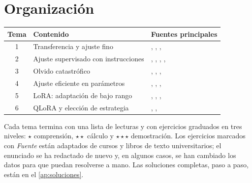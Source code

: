 \documentclass[11pt,a4paper,twoside,openany]{book}
\begin{document}
\section*{Organización}
\begin{center}\small
\begin{tabular}{@{}cll@{}}
\toprule
Tema & Contenido & Fuentes principales \\
\midrule
1 & Transferencia y ajuste fino & \cite{jm3}, \cite{howard-ruder}, \cite{d2l}, \cite{cs224n} \\
2 & Ajuste supervisado con instrucciones & \cite{jm3}, \cite{cs336}, \cite{wei-flan}, \cite{ouyang}, \cite{zhou-lima} \\
3 & Olvido catastrófico & \cite{mccloskey}, \cite{kirkpatrick}, \cite{bishop}, \cite{gbc} \\
4 & Ajuste eficiente en parámetros & \cite{houlsby}, \cite{lester}, \cite{li-liang}, \cite{aghajanyan} \\
5 & LoRA: adaptación de bajo rango & \cite{hu-lora}, \cite{eckart-young}, \cite{mml}, \cite{cs224n} \\
6 & QLoRA y elección de estrategia & \cite{dettmers}, \cite{cs336a1}, \cite{jm3} \\
\bottomrule
\end{tabular}
\end{center}

Cada tema termina con una lista de lecturas y con ejercicios graduados en tres niveles: $\star$ comprensión, $\star\star$ cálculo y $\star\star\star$ demostración. Los ejercicios marcados con \emph{Fuente} están adaptados de cursos y libros de texto universitarios; el enunciado se ha redactado de nuevo y, en algunos casos, se han cambiado los datos para que puedan resolverse a mano. Las soluciones completas, paso a paso, están en el \cref{ap:soluciones}.
\end{document}
